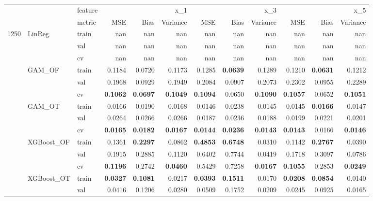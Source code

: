 \begin{tabular}{lllrrrrrrrrr}
 &  & feature & \multicolumn{3}{r}{x_1} & \multicolumn{3}{r}{x_3} & \multicolumn{3}{r}{x_5} \\
 &  & metric & MSE & Bias & Variance & MSE & Bias & Variance & MSE & Bias & Variance \\
\multirow[c]{15}{*}{1250} & \multirow[c]{3}{*}{LinReg} & train & nan & nan & nan & nan & nan & nan & nan & nan & nan \\
 &  & val & nan & nan & nan & nan & nan & nan & nan & nan & nan \\
 &  & cv & nan & nan & nan & nan & nan & nan & nan & nan & nan \\
 & \multirow[c]{3}{*}{GAM_OF} & train & 0.1184 & 0.0720 & 0.1173 & 0.1285 & \bfseries 0.0639 & 0.1289 & 0.1210 & \bfseries 0.0631 & 0.1212 \\
 &  & val & 0.1968 & 0.0929 & 0.1949 & 0.2084 & 0.0907 & 0.2073 & 0.2302 & 0.0955 & 0.2289 \\
 &  & cv & \bfseries 0.1062 & \bfseries 0.0697 & \bfseries 0.1049 & \bfseries 0.1094 & 0.0650 & \bfseries 0.1090 & \bfseries 0.1057 & 0.0652 & \bfseries 0.1051 \\
 & \multirow[c]{3}{*}{GAM_OT} & train & 0.0166 & 0.0190 & 0.0168 & 0.0146 & 0.0238 & 0.0145 & 0.0145 & \bfseries 0.0166 & 0.0147 \\
 &  & val & 0.0264 & 0.0266 & 0.0266 & 0.0187 & 0.0236 & 0.0188 & 0.0199 & 0.0221 & 0.0201 \\
 &  & cv & \bfseries 0.0165 & \bfseries 0.0182 & \bfseries 0.0167 & \bfseries 0.0144 & \bfseries 0.0236 & \bfseries 0.0143 & \bfseries 0.0143 & 0.0166 & \bfseries 0.0146 \\
 & \multirow[c]{3}{*}{XGBoost_OF} & train & 0.1361 & \bfseries 0.2297 & 0.0862 & \bfseries 0.4853 & \bfseries 0.6748 & 0.0310 & 0.1142 & \bfseries 0.2767 & 0.0390 \\
 &  & val & 0.1915 & 0.2885 & 0.1120 & 0.6402 & 0.7744 & 0.0419 & 0.1718 & 0.3097 & 0.0786 \\
 &  & cv & \bfseries 0.1196 & 0.2742 & \bfseries 0.0460 & 0.5429 & 0.7258 & \bfseries 0.0167 & \bfseries 0.1055 & 0.2853 & \bfseries 0.0249 \\
 & \multirow[c]{3}{*}{XGBoost_OT} & train & \bfseries 0.0327 & \bfseries 0.1081 & 0.0217 & \bfseries 0.0393 & \bfseries 0.1511 & 0.0170 & \bfseries 0.0208 & \bfseries 0.0854 & 0.0140 \\
 &  & val & 0.0416 & 0.1206 & 0.0280 & 0.0509 & 0.1752 & 0.0209 & 0.0245 & 0.0925 & 0.0165 \\

\end{tabular}
